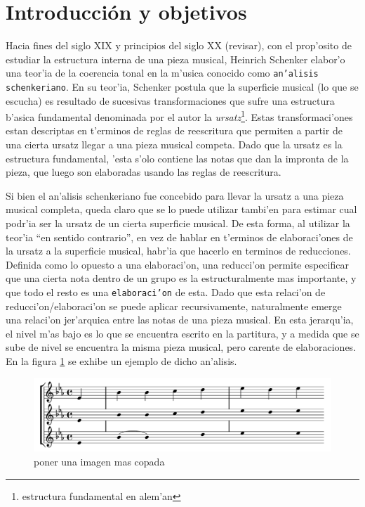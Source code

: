 \section{Introducci\'on y objetivos}
Hacia fines del siglo XIX y principios del siglo XX (\alert{revisar}), con el prop'osito de estudiar la estructura interna de una pieza musical, 
Heinrich Schenker elabor'o una teor'ia de la coerencia tonal en la m'usica conocido como \texttt{an'alisis schenkeriano}.
En su teor'ia, Schenker postula que la superficie musical (lo que se escucha) es resultado de sucesivas transformaciones que sufre una estructura b'asica fundamental 
denominada por el autor la \emph{ursatz}\footnote{estructura fundamental en alem'an}. Estas transformaci'ones estan descriptas en t'erminos de reglas de reescritura que permiten 
a partir de una cierta ursatz llegar a una pieza musical competa. Dado que la ursatz es la estructura fundamental, 'esta s'olo contiene las notas que dan la impronta de la pieza, 
que luego son elaboradas usando las reglas de reescritura.

Si bien el an'alisis schenkeriano fue concebido para llevar la ursatz a una pieza musical completa, queda claro que se lo puede utilizar tambi'en para estimar
cual podr'ia ser la ursatz de un cierta superficie musical. De esta forma, al utilizar la teor'ia ``en sentido contrario'', en vez de hablar en t'erminos de elaboraci'ones de 
la ursatz a la superficie musical, habr'ia que hacerlo en terminos de reducciones. Definida como lo opuesto a una elaboraci'on, una reducci'on permite especificar que una cierta 
nota dentro de un grupo es la estructuralmente mas importante, y que todo el resto es una \texttt{elaboraci'on} de esta. 
Dado que esta relaci'on de reducci'on/elaboraci'on se puede aplicar recursivamente, naturalmente emerge una relaci'on 
jer'arquica entre las notas de una pieza musical.  En esta jerarqu'ia, el nivel m'as bajo es lo que se encuentra escrito en la partitura, y a medida que se sube de nivel se 
encuentra la misma pieza musical, pero carente de elaboraciones. En la figura \ref{fig_analisis_schenkeriano} se exhibe un ejemplo de dicho an'alisis.


\begin{figure}[h]
\begin{center}
\includegraphics[width=12cm]{images/schenkerian_example.png}
\label{fig_analisis_schenkeriano}
\newline \alert{poner una imagen mas copada}
\end{center}
\end{figure}

